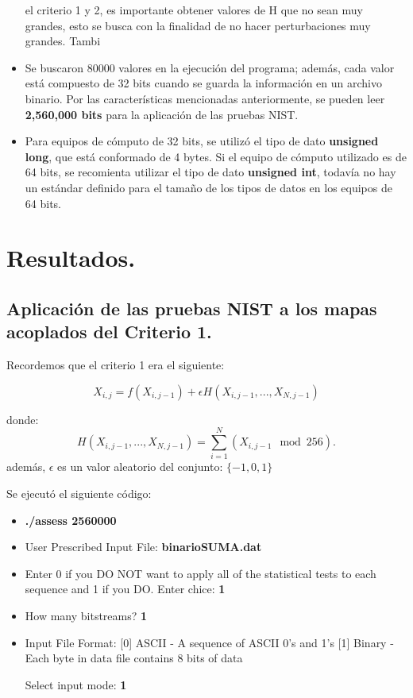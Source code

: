 \documentclass[12pt,3p]{elsarticle}
\begin{document}
\begin{itemize}

\En el criterio 1 y 2, es importante obtener valores de H que no sean muy grandes, esto se busca con la finalidad de no hacer perturbaciones muy grandes. Tambi

\item Se buscaron 80000 valores en la ejecución del programa; además, cada valor está compuesto de 32 bits cuando se guarda la información en un archivo binario. Por las características mencionadas anteriormente, se pueden leer \textbf{2,560,000 bits} para la aplicación de las pruebas NIST.

\item Para equipos de cómputo de 32 bits, se utilizó el tipo de dato \textbf{unsigned long}, que está conformado de 4 bytes. Si el equipo de cómputo utilizado es de 64 bits, se recomienta utilizar el tipo de dato \textbf{unsigned int}, todavía no hay un estándar definido para el tamaño de los tipos de datos en los equipos de 64 bits.
\end{itemize}





\section{Resultados.}

\subsection{Aplicación de las pruebas NIST a los mapas acoplados del Criterio 1.}
Recordemos que el criterio 1 era el siguiente:

\begin{equation}
X_{i,j}= f(X_{i,j-1})+ \epsilon  H(X_{i,j-1},...,X_{N,j-1})
\end{equation}

donde:
\begin{equation}
H(X_{i,j-1},...,X_{N,j-1}) = \sum_{i=1}^{N}(X_{i,j-1}\mod 256).
\end{equation}
además, $\epsilon$ es un valor aleatorio del conjunto: ${\{-1, 0, 1 \}}$



Se ejecutó el siguiente código:

\begin{itemize}
\item \textbf{./assess 2560000}
\item User Prescribed Input File: \textbf{binarioSUMA.dat}
\item    Enter 0 if you DO NOT want to apply all of the
         statistical tests to each sequence and 1 if you DO. Enter chice: \textbf{1}
                  
\item  How many bitstreams? \textbf{1}

\item Input File Format:
    [0] ASCII - A sequence of ASCII 0's and 1's
    [1] Binary - Each byte in data file contains 8 bits of data

   Select input mode:  \textbf{1}
\end{itemize}
\end{document}
